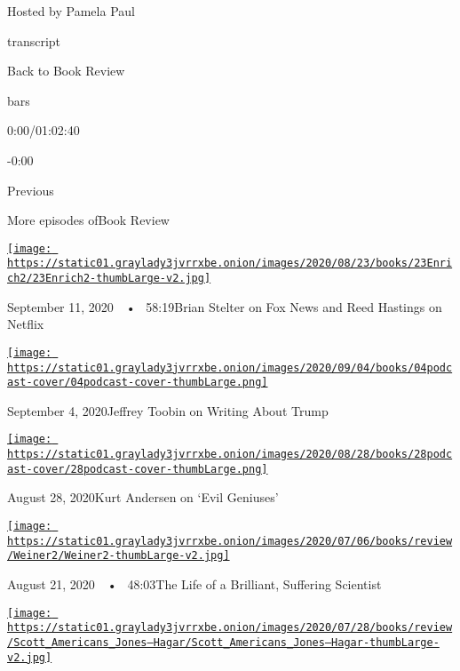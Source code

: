 Hosted by Pamela Paul

transcript

Back to Book Review

bars

0:00/01:02:40

-0:00

Previous

More episodes ofBook Review

\href{https://www.nytimes3xbfgragh.onion/2020/09/11/books/review/podcast-hoax-fox-news-donald-trump-brian-stelter-nextflix-reed-hastings.html?action=click\&module=audio-series-bar\&region=header\&pgtype=Article}{\texttt{[image: https://static01.graylady3jvrrxbe.onion/images/2020/08/23/books/23Enrich2/23Enrich2-thumbLarge-v2.jpg]}}

September 11, 2020~~•~ 58:19Brian Stelter on Fox News and Reed Hastings
on Netflix

\href{https://www.nytimes3xbfgragh.onion/2020/09/04/books/review/podcast-jeffrey-toobin-true-crimes-misdemeanors-trump-dayna-tortorici-elena-ferrante.html?action=click\&module=audio-series-bar\&region=header\&pgtype=Article}{\texttt{[image: https://static01.graylady3jvrrxbe.onion/images/2020/09/04/books/04podcast-cover/04podcast-cover-thumbLarge.png]}}

September 4, 2020Jeffrey Toobin on Writing About Trump

\href{https://www.nytimes3xbfgragh.onion/2020/08/28/books/review/podcast-evil-geniuses-kurt-andersen-fallout-hiroshima-lesley-m-m-blume.html?action=click\&module=audio-series-bar\&region=header\&pgtype=Article}{\texttt{[image: https://static01.graylady3jvrrxbe.onion/images/2020/08/28/books/28podcast-cover/28podcast-cover-thumbLarge.png]}}

August 28, 2020Kurt Andersen on `Evil Geniuses'

\href{https://www.nytimes3xbfgragh.onion/2020/08/21/books/review/podcast-Dominant-Character-Samanth-Subramanian-Book-of-Eels-Patrik-Svensson.html?action=click\&module=audio-series-bar\&region=header\&pgtype=Article}{\texttt{[image: https://static01.graylady3jvrrxbe.onion/images/2020/07/06/books/review/Weiner2/Weiner2-thumbLarge-v2.jpg]}}

August 21, 2020~~•~ 48:03The Life of a Brilliant, Suffering Scientist

\href{https://www.nytimes3xbfgragh.onion/2020/08/14/books/review/podcast-a-o-scott-edward-p-jones-eric-jay-dolin-furious-sky-hurricanes.html?action=click\&module=audio-series-bar\&region=header\&pgtype=Article}{\texttt{[image: https://static01.graylady3jvrrxbe.onion/images/2020/07/28/books/review/Scott\_Americans\_Jones--Hagar/Scott\_Americans\_Jones--Hagar-thumbLarge-v2.jpg]}}

